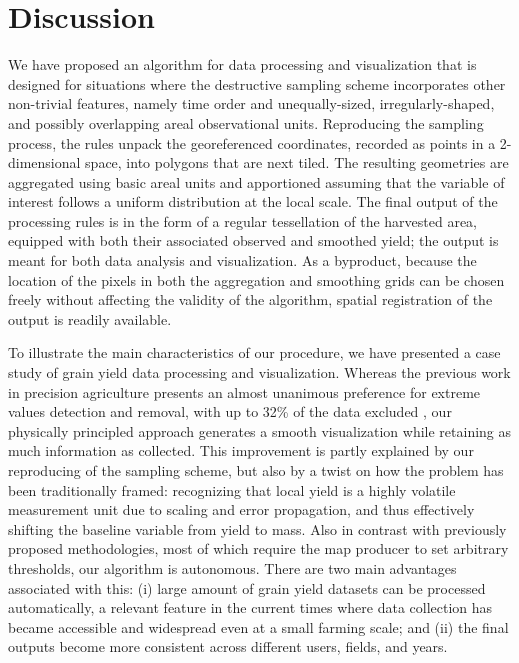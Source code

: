 \chapter{Discussion}

 We have proposed an algorithm
for data processing and visualization that is designed for situations
where the destructive sampling scheme incorporates other non-trivial
features, namely time order and unequally-sized, irregularly-shaped,
and possibly overlapping areal observational units. Reproducing the
sampling process, the rules unpack the georeferenced coordinates,
recorded as points in a 2-dimensional space, into polygons that are
next tiled. The resulting geometries are aggregated using basic areal
units and apportioned assuming that the variable of interest follows a
uniform distribution at the local scale. The final output of the
processing rules is in the form of a regular tessellation of the
harvested area, equipped with both their associated observed and
smoothed yield; the output is meant for both data analysis and
visualization. As a byproduct, because the location of the pixels in
both the aggregation and smoothing grids can be chosen freely without
affecting the validity of the algorithm, spatial registration of the
output is readily available.

 To illustrate the main
characteristics of our procedure, we have presented a case study of
grain yield data processing and visualization. Whereas the previous
work in precision agriculture presents an almost unanimous preference
for extreme values detection and removal, with up to 32\% of the data
excluded \cite{Lyle2013}, our physically principled approach generates
a smooth visualization while retaining as much information as
collected. This improvement is partly explained by our reproducing of
the sampling scheme, but also by a twist on how the problem has been
traditionally framed: recognizing that local yield is a highly
volatile measurement unit due to scaling and error propagation, and
thus effectively shifting the baseline variable from yield to
mass. Also in contrast with previously proposed methodologies, most of
which require the map producer to set arbitrary thresholds, our
algorithm is autonomous. There are two main advantages associated with
this: (i) large amount of grain yield datasets can be processed
automatically, a relevant feature in the current times where data
collection has became accessible and widespread even at a small
farming scale; and (ii) the final outputs become more consistent
across different users, fields, and years.

